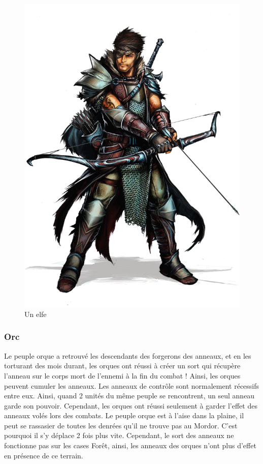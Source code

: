 \begin{figure}[!h]
\centering
\includegraphics[scale=0.10]{img/elf.png}
\caption{Un elfe}
\end{figure}

\subsubsection{Orc}

Le peuple orque a retrouvé les descendants des forgerons des anneaux, et en les torturant des mois durant, les orques ont réussi à créer un sort qui récupère l'anneau sur le corps mort de l'ennemi à la fin du combat ! Ainsi, les orques peuvent cumuler les anneaux.
\newline
\newline
Les anneaux de contrôle sont normalement récessifs entre eux. Ainsi, quand 2 unités du même peuple se rencontrent, un seul anneau garde son pouvoir. Cependant, les orques ont réussi seulement à garder l'effet des anneaux volés lors des combats.
\newline
\newline
Le peuple orque est à l'aise dans la plaine, il peut se rassasier de toutes les denrées qu'il ne trouve pas au Mordor. C'est pourquoi il s'y déplace 2 fois plus vite. 
\newline Cependant, le sort des anneaux ne fonctionne pas sur les cases Forêt, ainsi, les anneaux des orques n'ont plus d'effet en présence de ce terrain.

